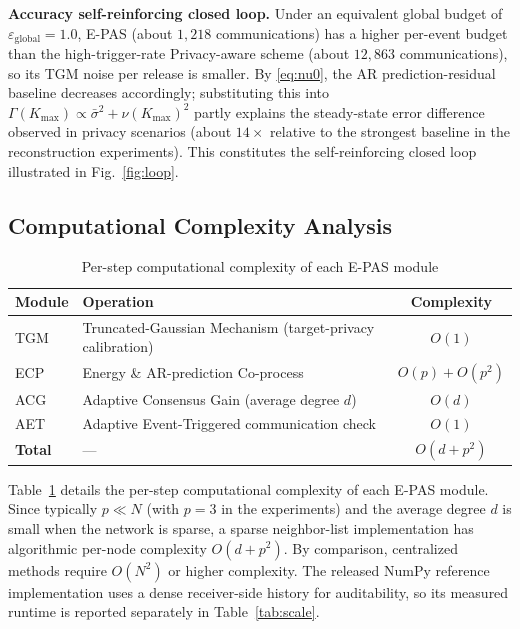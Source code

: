 \documentclass[10pt]{article}
\newcommand{\EPAS}{E-PAS}
\newcommand{\TGM}{TGM}
\newcommand{\AR}{AR}
\newcommand{\sbar}{\bar{\sigma}}
\newcommand{\numax}{\nu(K_{\max})}
\newcommand{\egl}{\varepsilon_{\text{global}}}
\begin{document}
\textbf{Accuracy self-reinforcing closed loop.} Under an equivalent global budget of $\egl=1.0$, \EPAS{} (about $1{,}218$ communications) has a higher per-event budget than the high-trigger-rate Privacy-aware scheme (about $12{,}863$ communications), so its \TGM{} noise per release is smaller. By \eqref{eq:nu0}, the \AR{} prediction-residual baseline decreases accordingly; substituting this into $\Gamma(K_{\max})\propto\sbar^2+\numax^2$ partly explains the steady-state error difference observed in privacy scenarios (about $14\times$ relative to the strongest baseline in the reconstruction experiments). This constitutes the self-reinforcing closed loop illustrated in Fig.~\ref{fig:loop}.

\subsection{Computational Complexity Analysis}\label{sec:complexity}

\begin{table}[htbp]
\caption{Per-step computational complexity of each E-PAS module}
\label{tab:complexity}
\centering
\begin{tabularx}{\columnwidth}{lXc}
\toprule
\textbf{Module} & \textbf{Operation} & \textbf{Complexity} \\
\midrule
TGM & Truncated-Gaussian Mechanism (target-privacy calibration) & $O(1)$ \\
ECP & Energy \& AR-prediction Co-process & $O(p) + O(p^2)$ \\
ACG & Adaptive Consensus Gain (average degree $d$) & $O(d)$ \\
AET & Adaptive Event-Triggered communication check & $O(1)$ \\
\midrule
\textbf{Total} & --- & $O(d + p^2)$ \\
\bottomrule
\end{tabularx}
\end{table}

Table~\ref{tab:complexity} details the per-step computational complexity of each \EPAS{} module. Since typically $p \ll N$ (with $p=3$ in the experiments) and the average degree $d$ is small when the network is sparse, a sparse neighbor-list implementation has algorithmic per-node complexity $O(d + p^2)$. By comparison, centralized methods require $O(N^2)$ or higher complexity. The released NumPy reference implementation uses a dense receiver-side history for auditability, so its measured runtime is reported separately in Table~\ref{tab:scale}.
\end{document}
